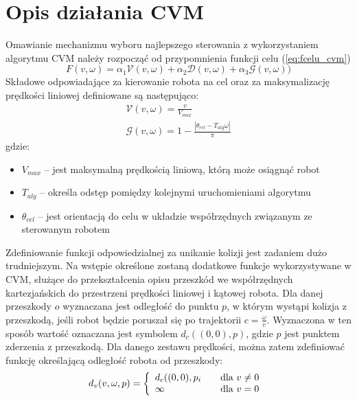 	\section{Opis działania CVM \label{sec:CVM:action}} 
	Omawianie mechanizmu wyboru najlepszego sterowania z wykorzystaniem algorytmu CVM należy rozpocząć od przypomnienia funkcji celu (\ref{eq:fcelu_cvm})
	\begin{equation*}
	F(v,\omega)=\alpha_1 \mathcal{V}(v,\omega)+\alpha_2 \mathcal{D}(v,\omega) + \alpha_3 \mathcal{G} (v,\omega))
	\end{equation*}
	Składowe odpowiadające za kierowanie robota na cel oraz za maksymalizację prędkości liniowej definiowane są następująco:
	\begin{gather}
	\mathcal{V}(v,\omega)=\frac{v}{V_{max}} \label{eq:CVM_speed}\\
	\mathcal{G}(v,\omega)=1-\frac{|\theta_{cel} -T_{alg}\omega|}{\pi} \label{eq:CVM_head}
	\end{gather}
	gdzie:
	\begin{itemize}
	 \item $V_{max}$ -- jest maksymalną prędkością liniową, którą może osiągnąć robot
	 \item $T_{alg}$ -- określa odstęp pomiędzy kolejnymi uruchomieniami algorytmu
	 \item $\theta_{cel}$ -- jest orientacją do celu w układzie współrzędnych związanym ze sterowanym robotem 
	\end{itemize}
	Zdefiniowanie funkcji odpowiedzialnej za unikanie kolizji jest zadaniem dużo trudniejszym. Na wstępie określone zostaną dodatkowe funkcje wykorzystywane w CVM, służące do 
	przekształcenia opisu przeszkód we współrzędnych kartezjańskich do przestrzeni prędkości liniowej i kątowej robota. Dla danej przeszkody $o$ wyznaczana jest odległość do punktu $p$, w którym wystąpi
	kolizja z przeszkodą, jeśli robot będzie poruszał się po trajektorii $c=\frac{\omega}{v}$. Wyznaczona w ten sposób wartość oznaczana jest symbolem
	$d_c((0,0),p)$, gdzie $p$ jest punktem zderzenia z przeszkodą. Dla danego zestawu prędkości, można zatem zdefiniować funkcję określającą odległość robota od przeszkody:
 	\begin{equation}\label{eq:CVM_dv}
	d_v(v,\omega,p)= \left\{ 
	\begin{array}{l l}
  	d_c((0,0),p_i & \quad \mbox{dla $v\neq0$}\\
  	\infty & \quad \mbox{dla $v=0$ }\\
	\end{array} \right. 
	\end{equation}
